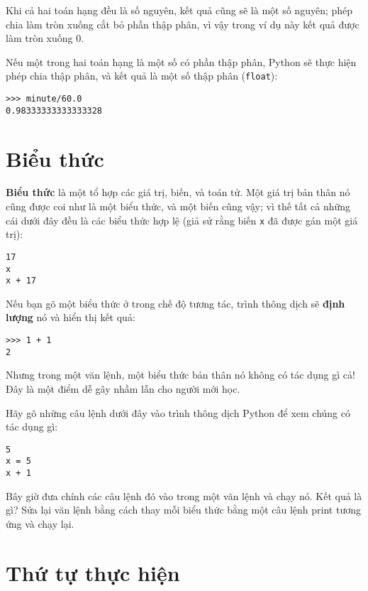\documentclass[11pt]{book}
\begin{document}
Khi cả hai toán hạng đều là số nguyên, kết quả cũng sẽ là một 
số nguyên; phép chia làm tròn xuống cắt bỏ phần thập phân, vì vậy
trong ví dụ này kết quả được làm tròn xuống 0.

Nếu một trong hai toán hạng là một số có phần thập phân, Python sẽ
thực hiện phép chia thập phân, và kết quả là một số thập phân ({\tt float}):

\beforeverb
\begin{verbatim}
>>> minute/60.0
0.98333333333333328
\end{verbatim}
\afterverb


\section{Biểu thức}

{\bf Biểu thức} là một tổ hợp các giá trị, biến, và toán tử.
Một giá trị bản thân nó cũng được coi như là một biểu thức,
và một biến cũng vậy; vì thế tất cả những cái dưới đây đều là
các biểu thức hợp lệ 
(giả sử rằng biến {\tt x} đã được gán một giá trị):


\beforeverb
\begin{verbatim}
17
x
x + 17
\end{verbatim}
\afterverb
%
Nếu bạn gõ một biểu thức ở trong chế độ tương tác, trình thông dịch
sẽ {\bf định lượng} nó và hiển thị kết quả:

\beforeverb
\begin{verbatim}
>>> 1 + 1
2
\end{verbatim}
\afterverb
%
Nhưng trong một văn lệnh, một biểu thức bản thân nó không có
tác dụng gì cả! Đây là một điểm dễ gây nhầm lẫn cho người mới
học.

\begin{ex}
Hãy gõ những câu lệnh dưới đây vào trình thông dịch Python để
xem chúng có tác dụng gì:

\beforeverb
\begin{verbatim}
5
x = 5
x + 1
\end{verbatim}
\afterverb
%
Bây giờ đưa chính các câu lệnh đó vào trong một văn lệnh và
chạy nó. Kết quả là gì? Sửa lại văn lệnh bằng cách thay mỗi
biểu thức bằng một câu lệnh print tương ứng và chạy lại.
\end{ex}


\section{Thứ tự thực hiện}
\end{document}
